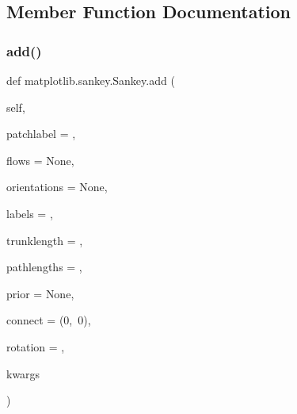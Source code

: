 \subsection{Member Function Documentation}
\mbox{\label{classmatplotlib_1_1sankey_1_1Sankey_a231e1e53a5750196b35d7d5ee92f5e24}} 
\subsubsection{\texorpdfstring{add()}{add()}}
{\footnotesize\ttfamily def matplotlib.\+sankey.\+Sankey.\+add (\begin{DoxyParamCaption}\item[{}]{self,  }\item[{}]{patchlabel = {\ttfamily \textquotesingle{}\textquotesingle{}},  }\item[{}]{flows = {\ttfamily None},  }\item[{}]{orientations = {\ttfamily None},  }\item[{}]{labels = {\ttfamily \textquotesingle{}\textquotesingle{}},  }\item[{}]{trunklength = {},  }\item[{}]{pathlengths = {},  }\item[{}]{prior = {\ttfamily None},  }\item[{}]{connect = {\ttfamily (0,~0)},  }\item[{}]{rotation = {},  }\item[{}]{kwargs }\end{DoxyParamCaption})}

